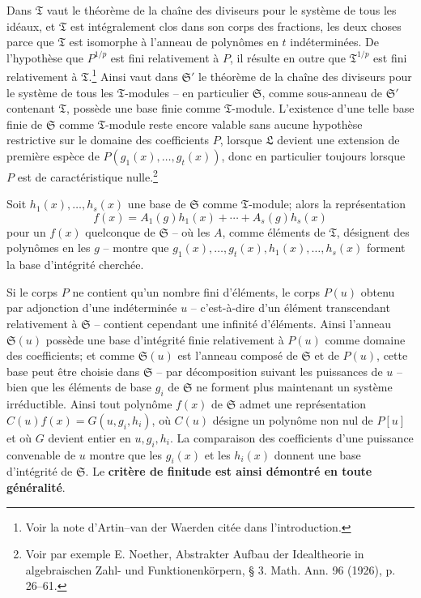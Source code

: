 Dans $\mathfrak T$ vaut le théorème de la chaîne des diviseurs pour le système de tous les idéaux, et $\mathfrak T$ est intégralement clos dans son corps des fractions, les deux choses parce que $\mathfrak T$ est isomorphe à l'anneau de polynômes en $t$ indéterminées. De l'hypothèse que $P^{1/p}$ est fini relativement à $P$, il résulte en outre que $\mathfrak T^{1/p}$ est fini relativement à $\mathfrak T$.\footnote{Voir la note d'Artin--van der Waerden citée dans l'introduction.} Ainsi vaut dans $\mathfrak S'$ le théorème de la chaîne des diviseurs pour le système de tous les $\mathfrak T$-modules -- en particulier $\mathfrak S$, comme sous-anneau de $\mathfrak S'$ contenant $\mathfrak T$, possède une base finie comme $\mathfrak T$-module\footnotemark[\value{footnote}]. L'existence d'une telle base finie de $\mathfrak S$ comme $\mathfrak T$-module reste encore valable sans aucune hypothèse restrictive sur le domaine des coefficients $P$, lorsque $\mathfrak L$ devient une extension de première espèce de $P(g_1(x),\ldots,g_t(x))$, donc en particulier toujours lorsque $P$ est de caractéristique nulle.\footnote{Voir par exemple E. Noether, Abstrakter Aufbau der Idealtheorie in algebraischen Zahl- und Funktionenkörpern, \S{} 3. Math. Ann. 96 (1926), p. 26--61.}

Soit $h_1(x),\ldots,h_s(x)$ une base de $\mathfrak S$ comme $\mathfrak T$-module; alors la représentation
\[
 f(x)=A_1(g)h_1(x)+\cdots+A_s(g)h_s(x)
\]
pour un $f(x)$ quelconque de $\mathfrak S$ -- où les $A$, comme éléments de $\mathfrak T$, désignent des polynômes en les $g$ -- montre que $g_1(x),\ldots,g_t(x),h_1(x),\ldots,h_s(x)$ forment la base d'intégrité cherchée.

Si le corps $P$ ne contient qu'un nombre fini d'éléments, le corps $P(u)$ obtenu par adjonction d'une indéterminée $u$ -- c'est-à-dire d'un élément transcendant relativement à $\mathfrak S$ -- contient cependant une infinité d'éléments. Ainsi l'anneau $\mathfrak S(u)$ possède une base d'intégrité finie relativement à $P(u)$ comme domaine des coefficients; et comme $\mathfrak S(u)$ est l'anneau composé de $\mathfrak S$ et de $P(u)$, cette base peut être choisie dans $\mathfrak S$ -- par décomposition suivant les puissances de $u$ -- bien que les éléments de base $g_i$ de $\mathfrak S$ ne forment plus maintenant un système irréductible. Ainsi tout polynôme $f(x)$ de $\mathfrak S$ admet une représentation $C(u)f(x)=G(u,g_i,h_i)$, où $C(u)$ désigne un polynôme non nul de $P[u]$ et où $G$ devient entier en $u,g_i,h_i$. La comparaison des coefficients d'une puissance convenable de $u$ montre que les $g_i(x)$ et les $h_i(x)$ donnent une base d'intégrité de $\mathfrak S$. Le \textbf{critère de finitude est ainsi démontré en toute généralité}.

